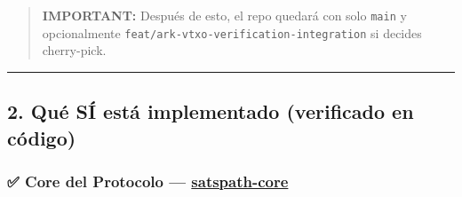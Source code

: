 \documentclass[
]{article}
\begin{document}
\begin{quote}
\textbf{IMPORTANT:} Después de esto, el repo quedará con solo
\texttt{main} y opcionalmente
\texttt{feat/ark-vtxo-verification-integration} si decides cherry-pick.
\end{quote}

\begin{center}\rule{0.5\linewidth}{0.5pt}\end{center}

\hypertarget{quuxe9-suxed-estuxe1-implementado-verificado-en-cuxf3digo}{%
\subsection{2. Qué SÍ está implementado (verificado en
código)}\label{quuxe9-suxed-estuxe1-implementado-verificado-en-cuxf3digo}}

\hypertarget{core-del-protocolo-satspath-core}{%
\subsubsection{\texorpdfstring{✅ Core del Protocolo ---
\href{file:///home/chelo/antigravity/PlanB/satspath/crates/satspath-core/src}{satspath-core}}{✅ Core del Protocolo --- satspath-core}}\label{core-del-protocolo-satspath-core}}
\end{document}
